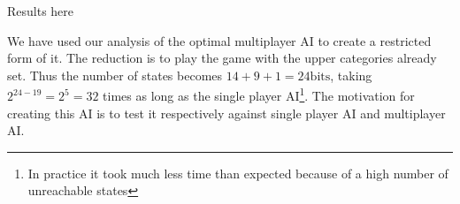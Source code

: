Results here

We have used our analysis of the optimal multiplayer AI to create a restricted form of it. The reduction is to play the game with the upper categories already set. Thus the number of states becomes $14+9+1 = 24\mbox{bits}$, taking $2^{24-19} = 2^5 = 32$ times as long as the single player AI\footnote{In practice it took much less time than expected because of a high number of unreachable states}. The motivation for creating this AI is to test it respectively against single player AI and multiplayer AI.
